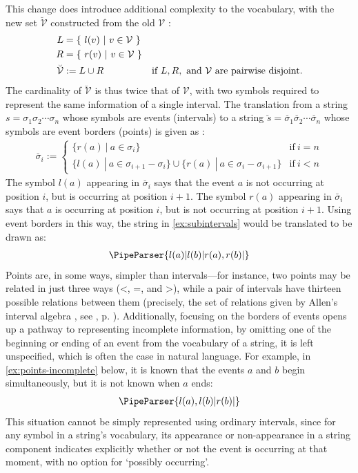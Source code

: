 \documentclass[a4paper,12pt,leqno]{article}
\newcommand{\vph}[1]{\vphantom{#1}}
\newcommand{\ebox}[1]{\fbox{$\vph{'(),}#1$}}
\newcommand{\V}{\mathcal{V}}
\newcommand{\EventString}[1]{%
	\renewcommand*{\do}[1]{\ebox{##1}}%
	\PipeParser{#1}%
}
\begin{document}
This change does introduce additional complexity to the vocabulary, with the new set $\breve{\V}$ constructed from the old $\V$ \cite[p. 37]{Fernando2018}:
\begin{align}
	L &= \{ ~l(v) ~|~ v \in \V~ \}&\notag\\
	R &= \{ ~r(v) ~|~ v \in \V~ \}&\notag\\
	\breve{\V} &:= L \cup R &\text{if } L, R, \text{ and } \V \text{ are pairwise disjoint.}
\end{align}
The cardinality of $\breve{\V}$ is thus twice that of $\V$, with two symbols required to represent the same information of a single interval. The translation from a string $s = \sigma_1\sigma_2\cdots\sigma_n$ whose symbols are events (intervals) to a string $\breve{s} = \breve{\sigma_1}\breve{\sigma_2}\cdots\breve{\sigma_n}$ whose symbols are event borders (points) is given as \cite[p. 38]{Fernando2018}:
\begin{align}
	\breve{\sigma_i} := \begin{cases}
		\{ r(a) ~|~ a \in \sigma_i \} & \text{if}~ i = n\\
		\{ l(a) ~|~ a \in \sigma_{i+1} - \sigma_i \} \cup \{ r(a) ~|~ a \in \sigma_{i} - \sigma_{i+1} \} & \text{if}~ i < n
	\end{cases}
\end{align}
The symbol $l(a)$ appearing in $\breve{\sigma_i}$ says that the event $a$ is not occurring at position $i$, but is occurring at position $i+1$. The symbol $r(a)$ appearing in $\breve{\sigma_i}$ says that $a$ is occurring at position $i$, but is not occurring at position $i+1$. Using event borders in this way, the string in \cref{ex:subintervals} would be translated to be drawn as:
\begin{align}
	\EventString{l(a)|l(b)|r(a),r(b)|{}}
\end{align}
Points are, in some ways, simpler than intervals---for instance, two points may be related in just three ways (\textless, =, and \textgreater), while a pair of intervals have thirteen possible relations between them (precisely, the set of relations given by Allen's interval algebra \citep{allen1983maintaining}, see , p. \pageref{tab:allen-rels-strings}). Additionally, focusing on the borders of events opens up a pathway to representing incomplete information, by omitting one of the beginning or ending of an event from the vocabulary of a string, it is left unspecified, which is often the case in natural language. For example, in \cref{ex:points-incomplete} below, it is known that the events $a$ and $b$ begin simultaneously, but it is not known when $a$ ends:
\begin{align}\label{ex:points-incomplete}
	\EventString{l(a),l(b)|r(b)|{}}
\end{align}
This situation cannot be simply represented using ordinary intervals, since for any symbol in a string's vocabulary, its appearance or non-appearance in a string component indicates explicitly whether or not the event is occurring at that moment, with no option for `possibly occurring'.
\end{document}
